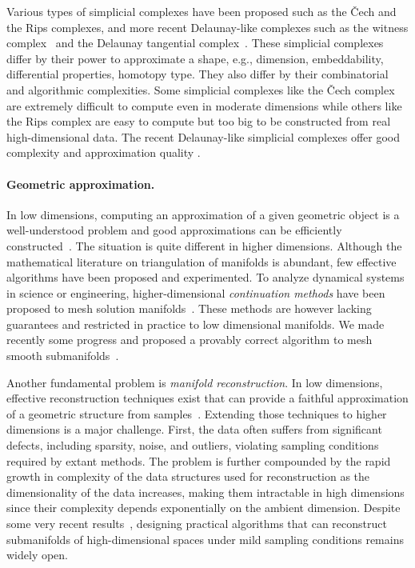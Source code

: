 Various types of simplicial complexes have been proposed such as the \v{C}ech and the Rips complexes, and more recent Delaunay-like complexes such as %
the witness complex~\cite{cds-tewc-2004} and the Delaunay tangential complex~\cite{geometrica-7142i}. These simplicial complexes differ by their power to approximate a shape, e.g., dimension, embeddability, differential properties, homotopy type. They also differ by their combinatorial and algorithmic complexities. %
Some simplicial complexes like the \v{C}ech complex are extremely difficult to compute
even in moderate dimensions while others like the Rips complex are easy to compute but too big
to be constructed from real high-dimensional data.  The recent Delaunay-like simplicial complexes
offer good complexity and approximation quality \cite{geometrica-7142i,cds-tewc-2004}.

\paragraph{Geometric approximation.}
In low dimensions, computing an approximation of a given geometric object is a well-understood problem and good approximations can be efficiently constructed~\cite{geometrica-bcmrv-ms-06,he-gtmg-2001}.  The situation is quite different in higher dimensions.  Although the mathematical literature on triangulation of manifolds is abundant, few effective algorithms have been proposed and experimented.  To analyze {dynamical systems} in science or engineering, higher-dimensional {\em continuation methods} have been proposed to mesh solution manifolds~\cite{mh-mpc-2002}. These methods are however lacking guarantees and restricted in practice to low dimensional manifolds. 
We made recently some progress and proposed a provably correct algorithm to mesh smooth submanifolds~\cite{boissonnat2010meshing}.

Another fundamental problem is {\em manifold reconstruction}.  In low dimensions, effective reconstruction techniques exist that can provide a faithful approximation of a geometric structure from samples~\cite{dey-csr-2007}. %
Extending those techniques to higher dimensions is a major challenge.  First, the data often suffers from significant defects, including sparsity, noise, and outliers, violating sampling conditions required by extant methods. The problem is further compounded by the rapid growth in complexity of the data structures used for reconstruction as the dimensionality of the data increases, making them intractable in high dimensions since their complexity depends exponentially on the ambient dimension. Despite some very recent results~\cite{geometrica-7142i}, designing practical algorithms that can reconstruct submanifolds of high-dimensional spaces under mild sampling conditions remains widely open.  

